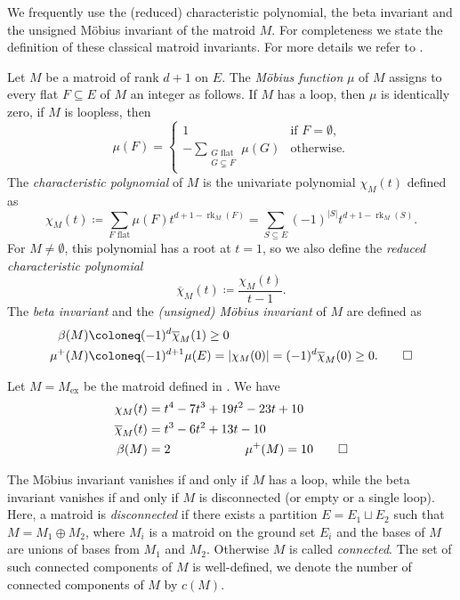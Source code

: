 \documentclass[12pt,a4paper,english]{scrartcl}
\DeclareMathOperator{\rank}{rk}
\begin{document}
We frequently use the (reduced) characteristic polynomial, the beta invariant and the unsigned Möbius invariant of the matroid $M$. For completeness we state the definition of these classical matroid invariants. For more details we refer to \cite{WhiteCombGeo1987}.
\begin{definition}
Let $M$ be a matroid of rank $d+1$ on $E$. The \emph{Möbius function} $\mu$ of $M$ assigns to every flat $F\subseteq E$ of $M$ an integer as follows. If $M$ has a loop, then $\mu$ is identically zero, if $M$ is loopless, then
\[
    \mu(F)=\begin{cases}
       1 &\text{if } F=\emptyset, \\
       -\sum_{\substack{G\text{ flat}\\G\subsetneq F}}\mu(G) & \text{otherwise.}
    \end{cases}
\]
The \emph{characteristic polynomial} of $M$ is the univariate polynomial $\chi_M(t)$ defined as
\[
\chi_M(t) \coloneq \sum_{F\text{ flat}}\mu(F)t^{d+1-\rank_M(F)} = \sum_{S \subseteq E} (-1)^{|S|}t^{d+1-\rank_M(S)}.
\]
For $M\neq \emptyset$, this polynomial has a root at $t=1$, so we also define the \emph{reduced characteristic polynomial}
\[
\overline{\chi}_M(t)\coloneq\frac{\chi_M(t)}{t-1}.
\]
The \emph{beta invariant} and the \emph{(unsigned) Möbius invariant} of $M$ are defined as
\begin{align*}
\beta(M)&\coloneq (-1)^d \overline{\chi}_M(1) \geq 0 \\
\mu^+(M)&\coloneq(-1)^{d+1}\mu(E) = |\chi_M(0)|=(-1)^d\overline{\chi}_M(0) \geq 0. \qedhere
\end{align*}
\end{definition}

\begin{example}
    \label{ex: matroidexcontinued}
    Let $M=M_{\text{ex}}$ be the matroid defined in . We have \begin{align*}
        \chi_M(t)&=t^4-7t^3+19t^2-23t+10 \\
    \overline{\chi}_M(t)&=t^3-6t^2+13t-10\\
        \beta(M)&=2  \qquad \qquad \qquad        \mu^+(M)=10 \qedhere
    \end{align*}
\end{example}

The Möbius invariant vanishes if and only if $M$ has a loop, while the beta invariant vanishes if and only if $M$ is disconnected (or empty or a single loop). Here, a matroid is \emph{disconnected} if there exists a partition $E = E_1 \sqcup E_2$ such that $M = M_1 \oplus M_2$, where $M_i$ is a matroid on the ground set $E_i$ and the bases of $M$ are unions of bases from $M_1$ and $M_2$. Otherwise $M$ is called \emph{connected}. The set of such connected components of $M$ is well-defined, we denote the number of connected components of $M$ by $c(M)$.
\end{document}
